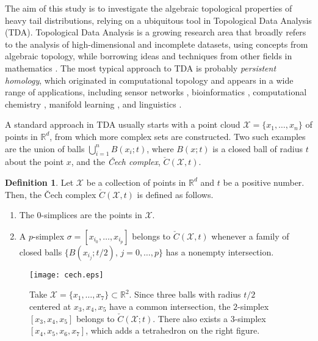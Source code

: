 \documentclass[11pt]{amsart}
\numberwithin{equation}{section}
\theoremstyle{plain}
\theoremstyle{definition}
\newtheorem{definition}[theorem]{Definition}
\begin{document}
The aim of this study is to investigate the algebraic topological properties of heavy tail distributions, relying on a ubiquitous tool in Topological Data Analysis (TDA). Topological Data Analysis is a growing research area that broadly refers to the analysis of high-dimensional and incomplete datasets, using concepts from algebraic topology, while borrowing ideas and techniques from other fields in mathematics \cite{carlsson:2009}. The most typical approach to TDA is probably \textit{persistent homology}, which originated in computational topology and appears in a wide range of applications, including sensor networks \cite{desilva:ghrist:2007}, bioinformatics \cite{dabaghian:memoli:frank:carlsson:2012}, computational chemistry \cite{martin:thompson:coutsias:watson:2010}, manifold learning \cite{niyogi:smale:weinberger:2008}, and linguistics \cite{port:gheorghita:guth:clark:liang:dasu:marcolli:2015}.

A standard approach in TDA usually starts with a point cloud $\mathcal X = \{ x_1,\dots,x_n \}$ of points in ${{\mathbb R}}^d$, from which more complex sets are constructed. Two such examples are the union of balls $\bigcup_{i=1}^n B(x_i; t)$, where $B(x; t)$ is a closed ball of radius $t$ about the point $x$, and the  \textit{\v{C}ech complex},
$\check{C}(\mathcal{X},t)$.
\begin{definition}
\label{cech:defn}
Let $\mathcal{X}$ be a collection of points in ${{\mathbb R}}^d$ and $t$ be a positive number. Then, the \v{C}ech complex $\check{C}(\mathcal{X},t)$ is defined as follows.
\begin{enumerate}
\item The $0$-simplices are the points in $\mathcal{X}$.
\item A $p$-simplex $\sigma=[x_{i_0}, \dots, x_{i_p}]$ belongs to $\check{C}(\mathcal{X},t)$ whenever a family of closed balls $\bigl\{ B(x_{i_j}; t/2), \, j=0,\dots,p \bigr\}$ has a nonempty intersection.
\end{enumerate}
\end{definition}
\begin{figure}[!t]
\begin{center}
\texttt{[image: cech.eps]}
\caption{{\footnotesize Take $\mathcal X = \{ x_1,\dots,x_7 \} \subset {{\mathbb R}}^2$. Since three balls with radius $t/2$ centered at $x_3, x_4, x_5$ have a common intersection, the $2$-simplex $[x_3,x_4,x_5]$ belongs to $\check{C}(\mathcal X; t)$. There also exists a $3$-simplex $[x_4,x_5,x_6,x_7]$, which adds a tetrahedron on the right figure. }}
\label{f:cech}
\end{center}
\end{figure}
\end{document}
